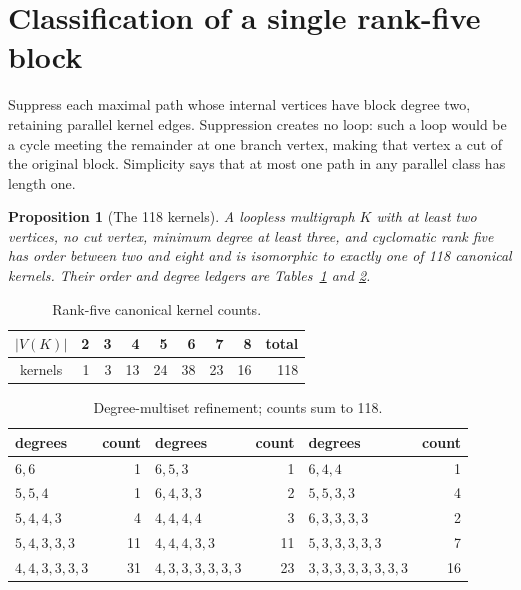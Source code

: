 \documentclass[11pt]{article}
\newtheorem{proposition}[theorem]{Proposition}
\theoremstyle{remark}
\begin{document}
\section{Classification of a single rank-five block}

Suppress each maximal path whose internal vertices have block degree two,
retaining parallel kernel edges.  Suppression creates no loop: such a loop
would be a cycle meeting the remainder at one branch vertex, making that vertex
a cut of the original block.  Simplicity says that at most one path in any
parallel class has length one.

\begin{proposition}[The 118 kernels]\label{prop:118}
A loopless multigraph $K$ with at least two vertices, no cut vertex, minimum
degree at least three, and cyclomatic rank five has order between two and eight
and is isomorphic to exactly one of 118 canonical kernels.  Their order and
degree ledgers are Tables~\ref{tab:orders} and \ref{tab:degrees}.
\end{proposition}

\begin{table}[ht]
\centering
\begin{tabular}{crrrrrrrr}
\toprule
$|V(K)|$&2&3&4&5&6&7&8&total\\\midrule
kernels&1&3&13&24&38&23&16&118\\\bottomrule
\end{tabular}
\caption{Rank-five canonical kernel counts.}\label{tab:orders}
\end{table}

\begin{table}[ht]
\centering\small
\begin{tabular}{lr@{\qquad}lr@{\qquad}lr}
\toprule
degrees&count&degrees&count&degrees&count\\\midrule
$6,6$&1&$6,5,3$&1&$6,4,4$&1\\
$5,5,4$&1&$6,4,3,3$&2&$5,5,3,3$&4\\
$5,4,4,3$&4&$4,4,4,4$&3&$6,3,3,3,3$&2\\
$5,4,3,3,3$&11&$4,4,4,3,3$&11&$5,3,3,3,3,3$&7\\
$4,4,3,3,3,3$&31&$4,3,3,3,3,3,3$&23&$3,3,3,3,3,3,3,3$&16\\
\bottomrule
\end{tabular}
\caption{Degree-multiset refinement; counts sum to 118.}\label{tab:degrees}
\end{table}
\end{document}
